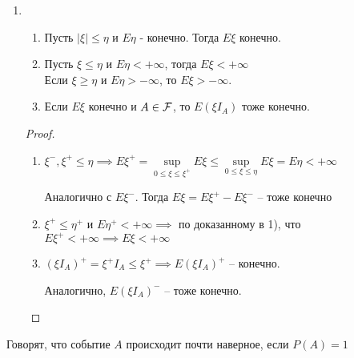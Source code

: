 
\begin{enumerate}[label=\protect\circled{\arabic*},series=mean_properties,start=5]

  \item
    \begin{enumerate}[label=\arabic*)]
      \item 
        Пусть $|\xi| \leq \eta$  и $E \eta$ - конечно. Тогда $E \xi$ конечно.
      
      \item 
        Пусть $\xi \leq \eta$ и $E \eta < +\infty$, тогда $E \xi < +\infty$\\
        Если $\xi \geq \eta$ и $E \eta > -\infty$, то $E \xi > -\infty$.
      
      \item 
        Если $E \xi$ конечно и $A \in \mathcal{F}$, то $E (\xi I_A)$ тоже конечно.
    \end{enumerate}

    \begin{proof}~
      \begin{enumerate}[label=\arabic*)]
        \item 
          $\xi^- , \xi^+ \leq \eta \implies
          E \xi^+ = \sup\limits_{0 \leq \xi \leq \xi^+} 
          E \xi \leq \sup\limits_{0 \leq \xi \leq \eta} E \xi = E \eta < +\infty$

          Аналогично с $E \xi^-$. Тогда $E \xi = E \xi^+ - E \xi^-$ -- тоже конечно\\

        \item 
          $\xi^+ \leq \eta^+$ и $E \eta^+ < +\infty \implies$ по доказанному в 1), что \\
          $E \xi^+ < +\infty \implies E \xi < +\infty$\\

        \item
          $(\xi I_A)^+ = \xi^+ I_A \leq \xi^+ \implies E(\xi I_A)^+$ -- конечно.

          Аналогично, $E(\xi I_A)^-$ -- тоже конечно.
      \end{enumerate}
    \end{proof}
\end{enumerate}

\begin{definition}
  Говорят, что событие $A$ происходит почти наверное, если $P(A) = 1$
\end{definition}

